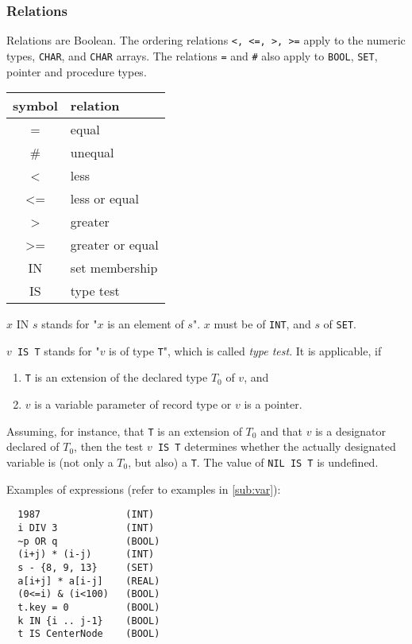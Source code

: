 \subsubsection{Relations}
Relations are Boolean. The ordering relations \verb|<, <=, >, >=| apply to the numeric
types, \verb|CHAR|, and \verb|CHAR| arrays. The relations \verb|=| and \verb|#| also
apply to \verb|BOOL|, \verb|SET|, pointer and procedure types.
\begin{table}[h!]
  \centering
  \begin{tabular}{c l}
    symbol & relation \\\hline
    =  & equal \\
    \# & unequal \\
    <  & less \\
    <= & less or equal \\
    >  & greater \\
    >= & greater or equal \\
    IN & set membership \\
    IS & type test
  \end{tabular}
\end{table}

$x\text{ IN }s$ stands for "$x$ is an element of $s$". $x$ must be of \verb|INT|, and $s$
of \verb|SET|.

$v$\verb| IS T| stands for "$v$ is of type \verb|T|", which is called \emph{type test}.
It is applicable, if
\begin{enumerate}
  \item \verb|T| is an extension of the declared type $T_0$ of $v$, and
  \item $v$ is a variable parameter of record type or $v$ is a pointer.
\end{enumerate}
Assuming, for instance, that \verb|T| is an extension of $T_0$ and that $v$ is a designator
declared of $T_0$, then the test $v$\verb| IS T| determines whether the actually designated
variable is (not only a $T_0$, but also) a \verb|T|. The value of \verb|NIL IS T| is undefined.

Examples of expressions (refer to examples in \ref{sub:var}):
\begin{verbatim}
  1987               (INT)
  i DIV 3            (INT)
  ~p OR q            (BOOL)
  (i+j) * (i-j)      (INT)
  s - {8, 9, 13}     (SET)
  a[i+j] * a[i-j]    (REAL)
  (0<=i) & (i<100)   (BOOL)
  t.key = 0          (BOOL)
  k IN {i .. j-1}    (BOOL)
  t IS CenterNode    (BOOL)
\end{verbatim}

